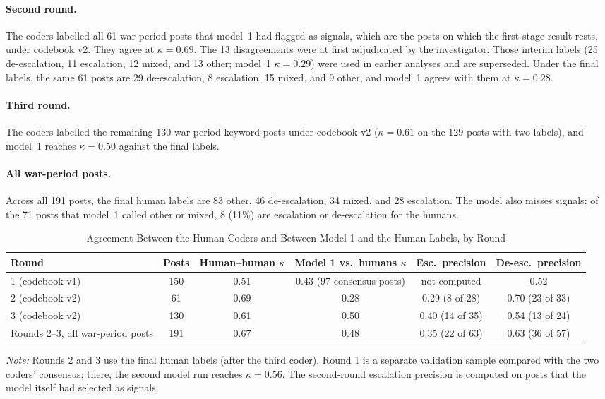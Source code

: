 \documentclass[11pt]{article}
\begin{document}
\paragraph{Second round.} The coders labelled all 61 war-period posts that model~1 had flagged as signals, which are the posts on which the first-stage result rests, under codebook v2. They agree at $\kappa = 0.69$. The 13 disagreements were at first adjudicated by the investigator. Those interim labels (25 de-escalation, 11 escalation, 12 mixed, and 13 other; model~1 $\kappa = 0.29$) were used in earlier analyses and are superseded. Under the final labels, the same 61 posts are 29 de-escalation, 8 escalation, 15 mixed, and 9 other, and model~1 agrees with them at $\kappa = 0.28$.

\paragraph{Third round.} The coders labelled the remaining 130 war-period keyword posts under codebook v2 ($\kappa = 0.61$ on the 129 posts with two labels), and model~1 reaches $\kappa = 0.50$ against the final labels.

\paragraph{All war-period posts.} Across all 191 posts, the final human labels are 83 other, 46 de-escalation, 34 mixed, and 28 escalation. The model also misses signals: of the 71 posts that model~1 called other or mixed, 8 (11\%) are escalation or de-escalation for the humans.

\begin{table}[h]
\centering
\small
\caption{Agreement Between the Human Coders and Between Model 1 and the Human Labels, by Round}
\label{tab:rounds}
\begin{tabular}{lccccc}
\toprule
Round & Posts & Human--human $\kappa$ & Model 1 vs.\ humans $\kappa$ & Esc.\ precision & De-esc.\ precision \\
\midrule
1 (codebook v1) & 150 & 0.51 & 0.43 (97 consensus posts) & not computed & 0.52 \\
2 (codebook v2) & 61 & 0.69 & 0.28 & 0.29 (8 of 28) & 0.70 (23 of 33) \\
3 (codebook v2) & 130 & 0.61 & 0.50 & 0.40 (14 of 35) & 0.54 (13 of 24) \\
Rounds 2--3, all war-period posts & 191 & 0.67 & 0.48 & 0.35 (22 of 63) & 0.63 (36 of 57) \\
\bottomrule
\end{tabular}

\vspace{0.5em}
\begin{minipage}{0.95\textwidth}
\footnotesize\textit{Note:} Rounds 2 and 3 use the final human labels (after the third coder). Round 1 is a separate validation sample compared with the two coders' consensus; there, the second model run reaches $\kappa = 0.56$. The second-round escalation precision is computed on posts that the model itself had selected as signals.
\end{minipage}
\end{table}
\end{document}
